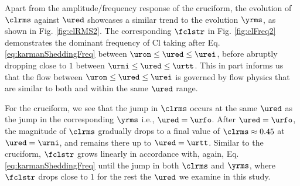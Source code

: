 \documentclass[a4paper,fleqn]{cas-sc}
\begin{document}
Apart from the amplitude/frequency response of the \angtw{} cruciform, the evolution of $\clrms$ against $\ured$ showcases a similar trend to the evolution $\yrms$, as shown in Fig. \ref{fig:clRMS2}. The corresponding $\fclstr$ in Fig. \ref{fig:clFreq2} demonstrates the dominant frequency of Cl taking after Eq. \ref{eq:karmanSheddingFreq} between $\uron \leq \ured \leq \urei$, before abruptly dropping close to $1$ between $\urni \leq \ured \leq \urtt$. This in part informs us that the flow between $\uron \leq \ured \leq \urei$ is governed by flow physics that are similar to both \angfo{} and \angth{} within the same $\ured$ range.

For the \angon{} cruciform, we see that the jump in $\clrms$ occurs at the same $\ured$ as the jump in the corresponding $\yrms$ i.e., $\ured = \urfo$. After $\ured = \urfo$, the magnitude of $\clrms$ gradually drops to a final value of $\clrms \approx 0.45$ at $\ured = \urni$, and remains there up to $\ured = \urtt$. Similar to the \angtw{} cruciform, $\fclstr$ grows linearly in accordance with, again, Eq. \ref{eq:karmanSheddingFreq} until the jump in both $\clrms$ and $\yrms$, where $\fclstr$ drops close to $1$ for the rest the $\ured$ we examine in this study.
\end{document}
